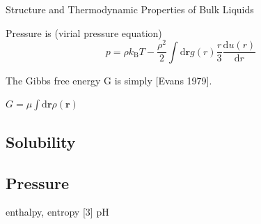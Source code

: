 Structure and Thermodynamic Properties of Bulk Liquids

Pressure is (virial pressure equation) 
\begin{equation}
p=\rho k_{\mathrm{B}}T-\dfrac{\rho^{2}}{2}\int\mathrm{d}\mathbf{r}g(r)\frac{r}{3}\frac{\mathrm{d}u(r)}{\mathrm{d}r}
\end{equation}


The Gibbs free energy G is simply {[}Evans 1979{]}.

$G=\mu\int\mathrm{d}\mathbf{r}\rho(\mathbf{r})$


\subsection{Solubility}


\subsection{Pressure}

enthalpy, entropy {[}3{]} pH
